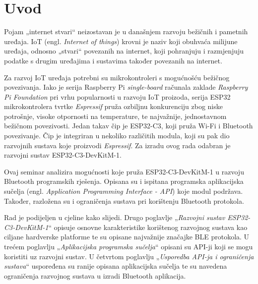 \chapter{Uvod}

Pojam „internet stvari“ neizostavan je u današnjem razvoju bežičnih i pametnih uređaja. IoT (engl. \textit{Internet of things}) krovni je naziv koji obuhvaća milijune uređaja, odnosno „stvari“ povezanih na internet, koji pohranjuju i razmjenjuju podatke s drugim uređajima i sustavima također povezanih na internet. \cite{what_is_iot} 

Za razvoj IoT uređaja potrebni su mikrokontroleri s mogućnošću bežičnog povezivanja. Iako je serija Raspberry Pi \textit{single-board} računala zaklade \textit{Raspberry Pi Foundation} pri vrhu popularnosti u razvoju IoT proizoda, serija ESP32 mikrokontrolera tvrtke \textit{Espressif} pruža ozbiljnu konkurenciju zbog niske potrošnje, visoke otpornosti na temperature, te najvažnije, jednostavnom bežičnom povezivosti. \cite{rasp_pi} \cite{rasp_pi_esp} Jedan takav čip je ESP32-C3, koji pruža Wi-Fi i Bluetooth povezivanje. Čip je integriran u nekoliko različitih modula, koji su pak dio razvojnih sustava koje proizvodi \textit{Espressif}. Za izradu ovog rada odabran je razvojni sustav ESP32-C3-DevKitM-1.

Ovaj seminar analizira mogućnosti koje pruža ESP32-C3-DevKitM-1 u razvoju Bluetooth programskih rješenja. Opisana su i ispitana programska aplikacijska sučelja (engl. \textit{Application Programming Interface - API}) koje modul podržava. Također, razložena su i ograničenja sustava pri korištenju Bluetooth protokola.

Rad je podijeljen u cjeline kako slijedi. Drugo poglavlje „\textit{Razvojni sustav ESP32-C3-DevKitM-1}“ opisuje osnovne karakteristike korištenog razvojnog sustava kao ciljane hardverske platforme te su opisane najvažnije značajke BLE protokola. U trećem poglavlju „\textit{Aplikacijska programska sučelja}“ opisani su API-ji koji se mogu koristiti uz razvojni sustav. U četvrtom poglavlju „\textit{Usporedba API-ja i ograničenja sustava}“ uspoređena su ranije opisana aplikacijska sučelja te su navedena ograničenja razvojnog sustava u izradi Bluetooth aplikacija.

\eject